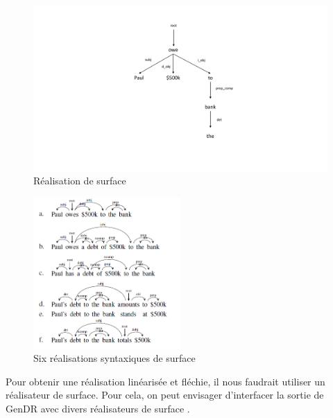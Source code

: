 \begin{figure}[htb]
	\centering
	\includegraphics[width=1\textwidth, trim = {0cm 3cm 0cm 2cm},clip]{ch3/figs/realsurfex.pdf}
	\caption{Réalisation de surface}
	\label{fig:realsurfex}
\end{figure} 

\begin{figure}[htb]
	\centering
	\includegraphics[width=0.5\textwidth, trim = {0cm 0cm 0cm 0cm},clip]{ch3/figs/exemples_real.png}
	\caption{Six réalisations syntaxiques de surface \citep{lareau18}}
	\label{fig:6realsurf}
\end{figure}

Pour obtenir une réalisation linéarisée et fléchie, il nous faudrait utiliser un réalisateur de surface. Pour cela, on peut envisager d'interfacer la sortie de GenDR avec divers réalisateurs de surface \citep{DaoustJSREALTextRealizer2015, DBLP:conf/enlg/MolinsL15, GattSimpleNLGRealisationEngine2009, BelzFirstSurfaceRealisation2011}.


